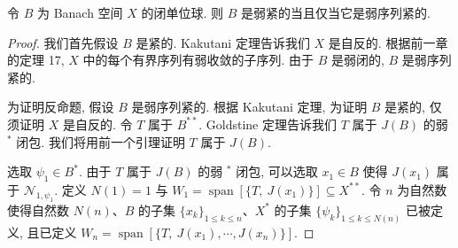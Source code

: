 \documentclass[../../main.tex]{subfiles}
\begin{document}
\begin{theorem}\label{theorem:ch15-eberlein-smulian}
令 $B$ 为 Banach 空间 $X$ 的闭单位球. 则 $B$ 是弱紧的当且仅当它是弱序列紧的.
\end{theorem}

\begin{proof}
我们首先假设 $B$ 是紧的. Kakutani 定理告诉我们 $X$ 是自反的. 根据前一章的定理 17, $X$ 中的每个有界序列有弱收敛的子序列. 由于 $B$ 是弱闭的, $B$ 是弱序列紧的.

为证明反命题, 假设 $B$ 是弱序列紧的. 根据 Kakutani 定理, 为证明 $B$ 是紧的, 仅须证明 $X$ 是自反的. 令 $T$ 属于 $B^{**}$. Goldstine 定理告诉我们 $T$ 属于 $J(B)$ 的弱 $^{*}$ 闭包. 我们将用前一个引理证明 $T$ 属于 $J(B)$.

选取 $\psi_{1}\in B^{*}$. 由于 $T$ 属于 $J(B)$ 的弱 $^{*}$ 闭包, 可以选取 $x_{1}\in B$ 使得 $J(x_{1})$ 属于 $\mathcal{N}_{1,\psi_{1}}$. 定义 $N(1)=1$ 与 $W_{1}=\operatorname{span}[\{T,\ J(x_{1})\}]\subseteq X^{**}$. 令 $n$ 为自然数使得自然数 $N(n)$、$B$ 的子集 $\{x_{k}\}_{1\leqslant k\leqslant n}$、$X^{*}$ 的子集 $\{\psi_{k}\}_{1\leqslant k\leqslant N(n)}$ 已被定义, 且已定义 $W_{n}=\operatorname{span}[\{T,\ J(x_{1}),\cdots,J(x_{n})\}]$.


\end{proof}
\end{document}
